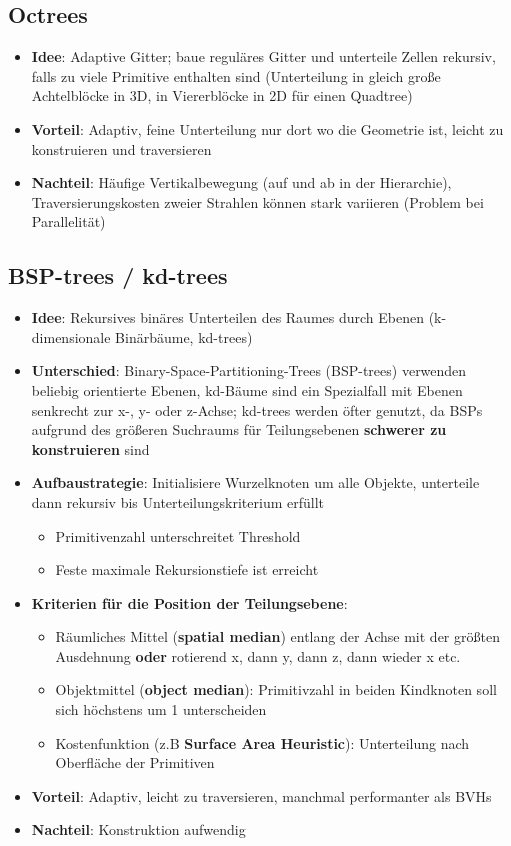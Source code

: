 \subsection{Octrees}%
\label{ds:sub:octrees}

\begin{itemize}
	\item \textbf{Idee}: Adaptive Gitter; baue reguläres Gitter und unterteile Zellen rekursiv, falls zu viele Primitive enthalten sind (Unterteilung in gleich große Achtelblöcke in 3D, in Viererblöcke in 2D für einen Quadtree)
	\item \textbf{Vorteil}: Adaptiv, feine Unterteilung nur dort wo die Geometrie ist, leicht zu konstruieren und traversieren
	\item \textbf{Nachteil}: Häufige Vertikalbewegung (auf und ab in der Hierarchie), Traversierungskosten zweier Strahlen können stark variieren (Problem bei Parallelität)
\end{itemize}

\subsection{BSP-trees / kd-trees}%
\label{ds:sub:bsp_trees_kd_trees}

\begin{itemize}
	\item \textbf{Idee}: Rekursives binäres Unterteilen des Raumes durch Ebenen (k-dimensionale Binärbäume, kd-trees)
	\item \textbf{Unterschied}: Binary-Space-Partitioning-Trees (BSP-trees) verwenden beliebig orientierte Ebenen, kd-Bäume sind ein Spezialfall mit Ebenen senkrecht zur x-, y- oder z-Achse; kd-trees werden öfter genutzt, da BSPs aufgrund des größeren Suchraums für Teilungsebenen \textbf{schwerer zu konstruieren} sind
	\item \textbf{Aufbaustrategie}: Initialisiere Wurzelknoten um alle Objekte, unterteile dann rekursiv bis Unterteilungskriterium erfüllt
	\begin{itemize}
		\item Primitivenzahl unterschreitet Threshold
		\item Feste maximale Rekursionstiefe ist erreicht
	\end{itemize}
	\item \textbf{Kriterien für die Position der Teilungsebene}:
	\begin{itemize}
		\item Räumliches Mittel (\textbf{spatial median}) entlang der Achse mit der größten Ausdehnung \textbf{oder} rotierend x, dann y, dann z, dann wieder x etc.
		\item Objektmittel (\textbf{object median}): Primitivzahl in beiden Kindknoten soll sich höchstens um 1 unterscheiden
		\item Kostenfunktion (z.B \textbf{Surface Area Heuristic}): Unterteilung nach Oberfläche der Primitiven
	\end{itemize}
	\item \textbf{Vorteil}: Adaptiv, leicht zu traversieren, manchmal performanter als BVHs
	\item \textbf{Nachteil}: Konstruktion aufwendig
\end{itemize}

